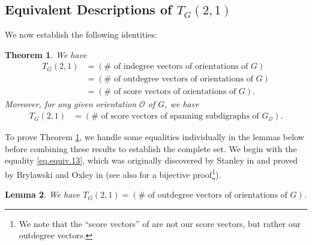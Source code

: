 \documentclass[12pt]{article}
\newtheorem{theorem}{Theorem}[section]
\newtheorem{lemma}[theorem]{Lemma}
\theoremstyle{definition}
\theoremstyle{remark}
\newcommand{\tup}[1]{\left( #1 \right)}
\newcommand{\Or}{\mathcal{O}}
\begin{document}
\subsection{Equivalent Descriptions of $T_G\tup{2,1}$}

We now establish the following identities:

\begin{theorem}\label{equiv}
    We have
    \begin{align}
        T_G\tup{2,1}
        &= (\# \text{ of indegree vectors of orientations of $G$})
        \label{eq.equiv.12} \\
        &= (\# \text{ of outdegree vectors of orientations of $G$})
        \label{eq.equiv.13} \\
        &= (\# \text{ of score vectors of orientations of $G$}).
        \label{eq.equiv.14}
    \end{align}
    Moreover, for any given orientation $\Or$ of $G$, we have
    \begin{align}
        T_G\tup{2,1}
        &=
        (\# \text{ of score vectors of spanning subdigraphs of $G_{\Or}$}).
        \label{eq.equiv.15}
    \end{align}
\end{theorem}

To prove Theorem \ref{equiv}, we handle some equalities individually in the lemmas below before combining these results to establish the complete set.
We begin with the equality \eqref{eq.equiv.13}, which was originally discovered by Stanley in \cite{Stanley1980} and proved by Brylawski and Oxley in \cite[Proposition~6.3.19]{BrylawskiOxley1992} (see also \cite{KleitmanWinston} for a bijective proof\footnote{We note that the ``score vectors'' of \cite{KleitmanWinston} are not our score vectors, but rather our outdegree vectors.}).

\begin{lemma}\label{lem:1=3}
    We have $T_G(2,1) = (\# \text{ of outdegree vectors of orientations of $G$})$.
\end{lemma}
\end{document}
